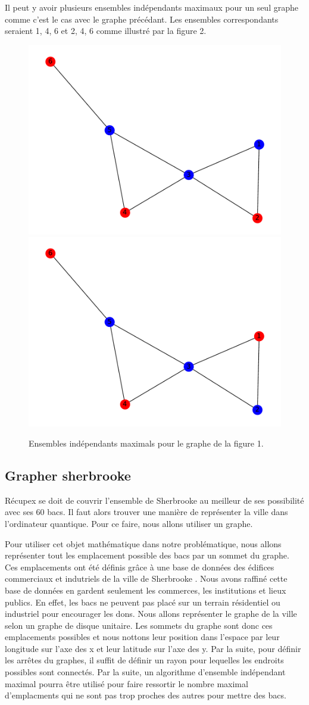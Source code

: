 \documentclass[11pt]{article}
\begin{document}
Il peut y avoir plusieurs ensembles indépendants maximaux pour un seul graphe comme c'est le cas avec le graphe précédant. Les ensembles correspondants seraient {1, 4, 6} et {2, 4, 6} comme illustré par la figure 2.

\begin{figure}[H]
    \centering
    \includegraphics[width=0.4\linewidth]{images/graphe_MIS_1.pdf}
    \includegraphics[width=0.4\linewidth]{images/graphe_MIS_2.pdf}
    \caption{Ensembles indépendants maximals pour le graphe de la figure 1.}
    \label{MIS_exemple}
\end{figure}



\subsection{Grapher sherbrooke}
Récupex se doit de couvrir l'ensemble de Sherbrooke au meilleur de ses possibilité avec ses 60 bacs. Il faut alors trouver une manière de représenter la ville dans l'ordinateur quantique. Pour ce faire,  nous allons utiliser un graphe. 

Pour utiliser cet objet mathématique dans notre problématique, nous allons représenter tout les emplacement possible des bacs par un sommet du graphe. Ces emplacements ont été définis grâce à une base de données des édifices commerciaux et indutriels de la ville de Sherbrooke \cite{noauthor_repertoire_nodate}. Nous avons raffiné cette base de données en gardent seulement les commerces, les institutions et lieux publics. En effet, les bacs ne peuvent pas placé sur un terrain résidentiel ou industriel pour encourager les dons. Nous allons représenter le graphe de la ville selon un graphe de disque unitaire. Les sommets du graphe sont donc ces emplacements possibles et nous nottons leur position dans l'espace par leur longitude sur l'axe des x et leur latitude sur l'axe des y. Par la suite, pour définir les arrêtes du graphes, il suffit de définir un rayon pour lequelles les endroits possibles sont connectés. Par la suite, un algorithme d'ensemble indépendant maximal pourra être utilisé pour faire ressortir le nombre maximal d'emplacments qui ne sont pas trop proches des autres pour mettre des bacs.
\end{document}
